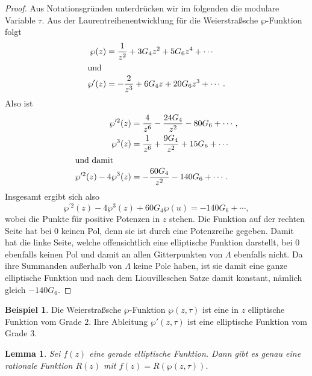 \documentclass[a4paper,twoside,openright]{report}
\newtheorem{lem}[thm]{Lemma}
\theoremstyle{definition}
\newtheorem{xca}[thm]{Beispiel}
\theoremstyle{remark}
\begin{document}
\begin{proof}
  Aus Notationsgründen unterdrücken wir im folgenden die modulare Variable $\tau$. 
  Aus der Laurentreihenentwicklung für die Weierstraßsche $\wp$-Funktion folgt
  \begin{align*}
    \wp(z) & = \frac 1 {z^2} + 3 G_4 z^2 + 5 G_6 z^4 + \dotsb \\
    \intertext{und}
    \wp'(z) & = - \frac 2 {z^3} + 6 G_4 z + 20 G_6 z^3 + \dotsb.
  \end{align*}
  Also ist
  \begin{align*}
    \wp^{\prime 2}(z) & = \frac 4 {z^6} - \frac{24 G_4}{z^2} - 80 G_6 + \dotsb,\\
    \wp^3(z) & = \frac 1 {z^6} + \frac{9 G_4}{z^2} + 15 G_6 + \dotsb\\
    \intertext{und damit}
    \wp^{\prime 2}(z) - 4 \wp^3(z) & = -\frac{60 G_4}{z^2} - 140 G_6 + \dotsb.
  \end{align*}
  Insgesamt ergibt sich also
  \[
    \wp^{\prime 2}(z) - 4 \wp^3(z) + 60 G_4 \wp(u)  = - 140 G_6 + \dotsb,
  \]
  wobei die Punkte für positive Potenzen in $z$ stehen. Die Funktion auf der
  rechten Seite hat bei $0$ keinen Pol, denn sie ist durch eine Potenzreihe
  gegeben. Damit hat die linke Seite, welche offensichtlich eine elliptische Funktion
  darstellt, bei $0$ ebenfalls keinen Pol und damit an
  allen Gitterpunkten von $\Lambda$ ebenfalls nicht. Da ihre Summanden außerhalb
  von $\Lambda$ keine Pole haben, ist sie damit eine ganze elliptische Funktion
  und nach dem Liouvilleschen Satze damit konstant, nämlich gleich $-140 G_6$.
\end{proof}

\begin{xca}
  Die Weierstraßsche $\wp$-Funktion $\wp(z, \tau)$ ist eine in $z$ elliptische Funktion
  vom Grade $2$. Ihre Ableitung $\wp'(z, \tau)$ ist eine elliptische Funktion vom Grade
  $3$.
\end{xca}

\begin{lem}
  Sei $f(z)$ eine gerade elliptische Funktion. Dann gibt es genau eine rationale
  Funktion $R(z)$ mit $f(z) = R(\wp(z, \tau))$.
\end{lem}
\end{document}
